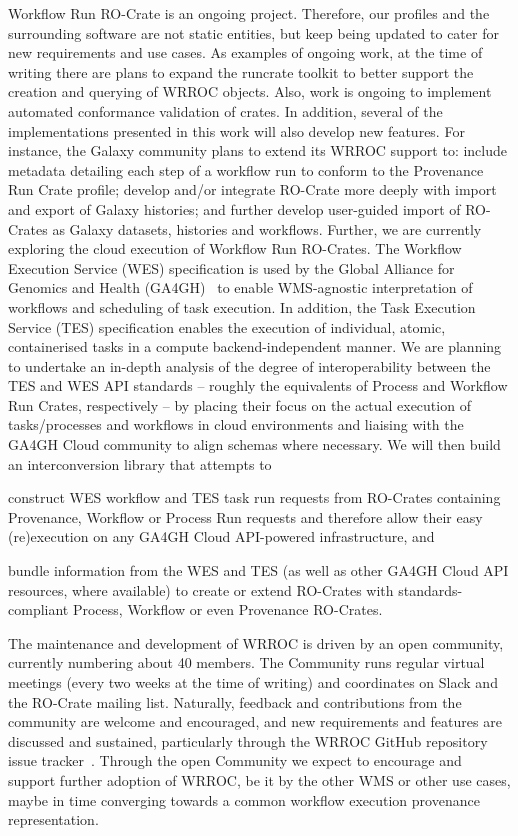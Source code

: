 Workflow Run RO-Crate is an ongoing project. Therefore, our profiles and the surrounding software are not static entities, but keep being updated to cater for new requirements and use cases.
%
As examples of ongoing work, at the time of writing there are plans to expand the runcrate toolkit to better support the creation and querying of WRROC objects.  Also, work is ongoing to implement automated conformance validation of crates.
In addition, several of the implementations presented in this work will also develop new features. For instance, the Galaxy community plans to extend its WRROC support to: include metadata detailing each step of a workflow run to conform to the Provenance Run Crate profile; develop and/or integrate RO-Crate more deeply with import and export of Galaxy histories; and further develop user-guided import of RO-Crates as Galaxy datasets, histories and workflows.
%
Further, we are currently exploring the cloud execution of Workflow Run RO-Crates.
The Workflow Execution Service (WES) specification is used by the Global Alliance for Genomics and Health (GA4GH)~\cite{Rehm 2021} to enable WMS-agnostic interpretation of workflows and scheduling of task execution. In addition, the Task Execution Service (TES) specification enables the execution of individual, atomic, containerised tasks in a compute backend-independent manner.
%
We are planning to undertake an in-depth analysis of the degree of interoperability between the TES and WES API standards -- roughly the equivalents of Process and Workflow Run Crates, respectively -- by placing their focus on the actual execution of tasks/processes and workflows in cloud environments and liaising with the GA4GH Cloud community to align schemas where necessary.
We will then build an interconversion library that attempts to
\begin{inlineenum}
\item construct WES workflow and TES task run requests from RO-Crates containing Provenance, Workflow or Process Run requests and therefore allow their easy (re)execution on any GA4GH Cloud API-powered infrastructure, and
\item bundle information from the WES and TES (as well as other GA4GH Cloud API resources, where available) to create or extend RO-Crates with standards-compliant Process, Workflow or even Provenance RO-Crates.
\end{inlineenum}

The maintenance and development of WRROC is driven by an open community,
currently numbering about 40 members. The Community runs regular virtual
meetings (every two weeks at the time of writing) and coordinates on Slack and
the RO-Crate mailing list.
Naturally, feedback and contributions from the community are welcome and
encouraged, and new requirements and features are discussed and sustained, particularly
through the WRROC GitHub repository issue tracker~\cite{run-crate-repository}.
Through the open Community we expect to encourage and support further adoption of WRROC, be it by the other WMS or other use cases, maybe in time converging towards a common workflow execution provenance representation.



